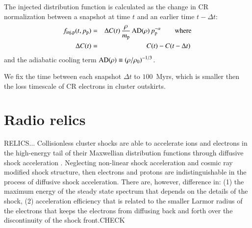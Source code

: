 \documentclass[useAMS,usenatbib]{mn2e}
\def\del#1{{}}
\newcommand{\dd}{\mathrm{d}}
\newcommand{\eps}{\varepsilon}
\newcommand{\p}{\mathrm{p}}
\newcommand{\CR}{\mathrm{CR}}
\newcommand{\B}{\mathrm{B}}
\begin{document}
The injected distribution function is calculated as the change in
CR normalization between a snapshot at time $t$ and an earlier time 
$t-\Delta t$:
\begin{eqnarray}
  \label{eq:finj}
f_\rmn{inj,p}(t,p_\p) &=& \Delta C(t)\,\frac{\rho}{m_\p}\,\rmn{AD(\rho)} \,p_\p^{-\alpha}\qquad\rmn{where}\\
  \Delta  C(t) &=& C(t) - C(t-\Delta t)\,
\end{eqnarray}
and the adiabatic cooling term ${\mathrm{AD}}(\rho)\equiv\left(\rho/\rho_0\right)^{-1/3}$.

We fix the time between each snapshot $\Delta t$ to $100$~Myrs, which
is smaller then the loss timescale of CR electrons in cluster
outskirts. 

\del{The CR proton number density is given by
\begin{equation}
  \label{eq:ncr}
  n_{\CR} = \int_0^\infty \dd p_\p\, f_\p(p_\p) =
  \frac{C\, q^{1-\alpha}}{\alpha-1}\,,
\end{equation}
provided $\alpha >1$. The kinetic energy density of the CR
proton population is
\begin{eqnarray}
  \label{eq:epscr}
  \eps_\CR &=& \int_0^\infty  \dd p_\p\, f_\p(p_\p) \,T_{\rmn
    p}(p_\p)=\frac{C\, m_\p\,c^2}{\alpha-1} \, \times
  \nonumber \\
  && \left[\frac{1}{2}
    \, \B_{\frac{1}{1+q^2}} \left(
    \frac{\alpha-2}{2},\frac{3-\alpha}{2}\right) + q^{1-\alpha}
    \left(\sqrt{1+q^2}-1 \right) \right] \,,
\end{eqnarray}
where $T_\p(p_\p) = (\sqrt{1+p_\p^2} -1)\, m_\p\,c^2$ is the kinetic energy
of a CR proton. $\B_x(a,b)$ denotes the incomplete Beta-function, and
$\alpha>2$ is assumed.}


\section{Radio relics}
\label{section:relics}
RELICS...  Collisionless cluster shocks are able to accelerate ions
and electrons in the high-energy tail of their Maxwellian distribution
functions through diffusive shock acceleration \citep[for reviews
  see][]{1983RPPh...46..973D, 1987PhR...154....1B,
  2001RPPh...64..429M}. Neglecting non-linear shock acceleration and
cosmic ray modified shock structure, then electrons and protons are
indistinguishable in the process of diffusive shock
acceleration. There are, however, difference in: (1) the maximum
energy of the steady state spectrum that depends on the details of the
shock, (2) acceleration efficiency that is related to the smaller
Larmor radius of the electrons that keeps the electrons from diffusing
back and forth over the discontinuity of the shock front.CHECK
\end{document}
